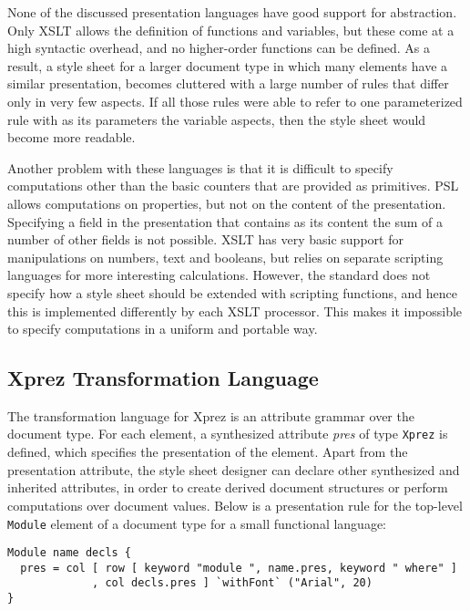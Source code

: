  None of the discussed presentation languages have good support for abstraction. Only XSLT allows the definition of functions and variables, but these come at a high syntactic overhead, and no higher-order functions can be defined. As a result, a style sheet for a larger document type in which many elements have a similar presentation, becomes cluttered with a large number of rules that differ only in very few aspects. If all those rules were able to refer to one parameterized rule with as its parameters the variable aspects, then the style sheet would become more readable.

Another problem with these languages is that it is difficult to specify computations other than the basic counters that are provided as primitives. PSL allows computations on properties, but not on the content of the presentation. Specifying a field in the presentation that contains as its content the sum of a number of other fields is not possible. XSLT has very basic support for manipulations on numbers, text and booleans, but relies on separate scripting languages for more interesting calculations. However, the standard does not specify how a style sheet should be extended with scripting functions, and hence this is implemented differently by each XSLT processor. This makes it impossible to specify computations in a uniform and portable way.


%																
\subsection{{\sc Xprez} Transformation Language}

The transformation language for {\sc Xprez} is an attribute grammar over the document type. For each element, a synthesized attribute {\em pres} of type \texttt{Xprez} is defined, which specifies the presentation of the element. Apart from the presentation attribute, the style sheet designer can declare other synthesized and inherited attributes, in order to create derived document structures or perform computations over document values. Below is a presentation rule for the top-level \texttt{Module} element of a document type for a small functional language:

\begin{small}
\begin{verbatim}
Module name decls {
  pres = col [ row [ keyword "module ", name.pres, keyword " where" ]   
             , col decls.pres ] `withFont` ("Arial", 20)
}
\end{verbatim}
\end{small}

